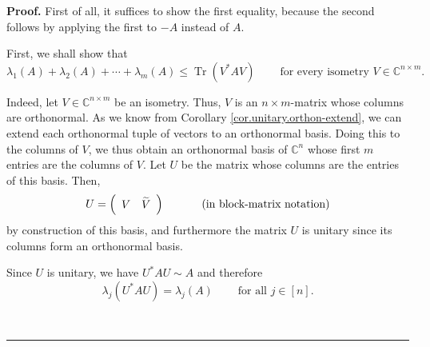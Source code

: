 \documentclass[numbers=enddot,12pt,final,onecolumn,notitlepage]{scrartcl}%
\numberwithin{exer}{subsection}
\theoremstyle{definition}
\newenvironment{proof}[1][Proof]{\noindent\textbf{#1.} }{\ \rule{0.5em}{0.5em}}
\begin{document}
\begin{proof}
First of all, it suffices to show the first equality, because the second
follows by applying the first to $-A$ instead of $A$.

First, we shall show that%
\[
\lambda_{1}\left(  A\right)  +\lambda_{2}\left(  A\right)  +\cdots+\lambda
_{m}\left(  A\right)  \leq\operatorname*{Tr}\left(  V^{\ast}AV\right)
\ \ \ \ \ \ \ \ \ \ \text{for every isometry }V\in\mathbb{C}^{n\times m}.
\]


Indeed, let $V\in\mathbb{C}^{n\times m}$ be an isometry. Thus, $V$ is an
$n\times m$-matrix whose columns are orthonormal. As we know from Corollary
\ref{cor.unitary.orthon-extend}, we can extend each orthonormal tuple of
vectors to an orthonormal basis. Doing this to the columns of $V$, we thus
obtain an orthonormal basis of $\mathbb{C}^{n}$ whose first $m$ entries are
the columns of $V$. Let $U$ be the matrix whose columns are the entries of
this basis. Then,%
\[
U=\left(
\begin{array}
[c]{cc}%
V & \widetilde{V}%
\end{array}
\right)  \ \ \ \ \ \ \ \ \ \ \left(  \text{in block-matrix notation}\right)
\]
by construction of this basis, and furthermore the matrix $U$ is unitary since
its columns form an orthonormal basis.

Since $U$ is unitary, we have $U^{\ast}AU\sim A$ and therefore%
\[
\lambda_{j}\left(  U^{\ast}AU\right)  =\lambda_{j}\left(  A\right)
\ \ \ \ \ \ \ \ \ \ \text{for all }j\in\left[  n\right]  .
\]



\end{proof}
\end{document}
